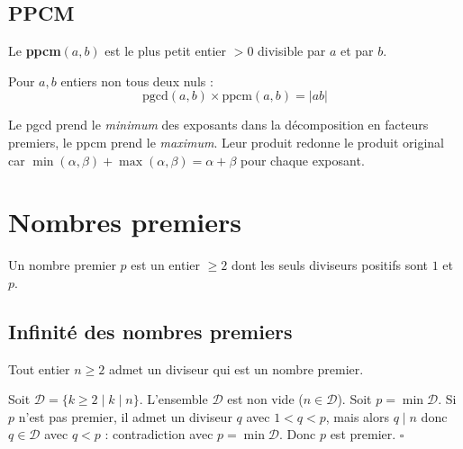\subsection{PPCM}

\begin{defbox}[--- PPCM]
Le \textbf{ppcm}$(a, b)$ est le plus petit entier $> 0$ divisible par $a$ et par $b$.
\end{defbox}

\begin{propbox}
Pour $a, b$ entiers non tous deux nuls :
\[
  \text{pgcd}(a, b) \times \text{ppcm}(a, b) = |ab|
\]
\end{propbox}

\begin{intuitionbox}
Le pgcd prend le \emph{minimum} des exposants dans la décomposition en facteurs premiers, le ppcm prend le \emph{maximum}. Leur produit redonne le produit original car $\min(\alpha, \beta) + \max(\alpha, \beta) = \alpha + \beta$ pour chaque exposant.
\end{intuitionbox}


\section{Nombres premiers}

\begin{defbox}
Un nombre premier $p$ est un entier $\geqslant 2$ dont les seuls diviseurs positifs sont $1$ et $p$.
\end{defbox}

\subsection{Infinité des nombres premiers}

\begin{lemme}
Tout entier $n \geqslant 2$ admet un diviseur qui est un nombre premier.
\end{lemme}

\begin{proofbox}
Soit $\mathcal{D} = \{k \geqslant 2 \mid k \mid n\}$. L'ensemble $\mathcal{D}$ est non vide ($n \in \mathcal{D}$). Soit $p = \min \mathcal{D}$. Si $p$ n'est pas premier, il admet un diviseur $q$ avec $1 < q < p$, mais alors $q \mid n$ donc $q \in \mathcal{D}$ avec $q < p$ : contradiction avec $p = \min \mathcal{D}$. Donc $p$ est premier. \hfill$\square$
\end{proofbox}

